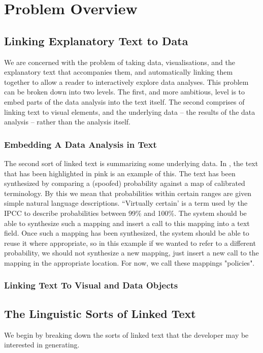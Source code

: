 \section{Problem Overview}
\label{sec:overview}

\subsection{Linking Explanatory Text to Data}
We are concerned with the problem of taking data, visualisations, and the explanatory text
that accompanies them, and automatically linking them together to allow a reader to interactively explore
data analyses. This problem can be broken down into two levels. The first, and more ambitious, level
is to embed parts of the data analysis into the text itself. The second comprises of linking text
to visual elements, and the underlying data -- the results of the data analysis -- rather than the
analysis itself.


\subsubsection{Embedding A Data Analysis in Text}
The second sort of linked text is summarizing some underlying data. In ,
the text that has been highlighted in pink is an example of this. The text has been synthesized
by comparing a (spoofed) probability against a map of calibrated terminology. By this we mean that
probabilities within certain ranges are given simple natural language descriptions. ``Virtually certain'
is a term used by the IPCC to describe probabilities between 99\% and 100\%. The system should be able
to synthesize such a mapping and insert a call to this mapping into a text field. Once such a mapping
has been synthesized, the system should be able to reuse it where appropriate, so in this example if
we wanted to refer to a different probability, we should not synthesize a new mapping, just insert
a new call to the mapping in the appropriate location. For now, we call these mappings "policies".

\subsubsection{Linking Text To Visual and Data Objects}

\subsection{The Linguistic Sorts of Linked Text}
We begin by breaking down the sorts of linked text that the developer may
be interested in generating. 

